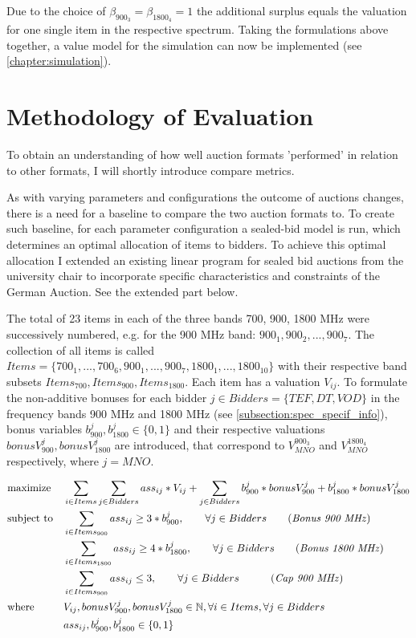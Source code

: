 Due to the choice of $ \beta_{900_{3}} = \beta_{1800_{4}} = 1 $ the additional surplus equals the valuation for one single item in the respective spectrum.
Taking the formulations above together, a value model for the simulation can now be implemented (see \autoref{chapter:simulation}). 

\section{Methodology of Evaluation}\label{subsection:meth-evaluation}
To obtain an understanding of how well auction formats 'performed' in relation to other formats, I will shortly introduce compare metrics. 

As with varying parameters and configurations the outcome of auctions changes, there is a need for a baseline to compare the two auction formats to. To create such baseline, for each parameter configuration a sealed-bid model is run, which determines an optimal allocation of items to bidders. 
To achieve this optimal allocation I extended an existing linear program for sealed bid auctions from the university chair to incorporate specific characteristics and constraints of the German Auction. See the extended part below.

The total of 23 items in each of the three bands 700, 900, 1800 MHz were successively numbered, e.g. for the 900 MHz band: $ 900_1, 900_2, ..., 900_7 $. The collection of all items is called $ Items = \{700_1, ..., 700_6, 900_1, ...,  900_7, 1800_1, ..., 1800_{10}\} $ with their respective band subsets $ Items_{700}, Items_{900}, Items_{1800} $. Each item has a valuation $ V_{ij} $. To formulate the non-additive bonuses for each bidder $ j \in Bidders = \{TEF, DT, VOD\}$ in the frequency bands 900 MHz and 1800 MHz (see \autoref{subsection:spec_specif_info}), bonus variables $ b_{900}^{j}, b_{1800}^{j} \in \{0,1\} $ and their respective valuations $ bonusV_{900}^{j} , bonusV_{1800}^{j} $ are introduced, that correspond to  $ V_{MNO}^{900_3} $ and $ V_{MNO}^{1800_4} $ respectively, where $ j = MNO $.

\begin{align*}
& {\text{maximize}}
& & \sum_{i \in Items} \sum_{j \in Bidders} ass_{ij} * V_{ij} + \sum_{j \in Bidders} b_{900}^{j} * bonusV_{900}^{j}  + b_{1800}^{j} * bonusV_{1800}^{j} \\
& \text{subject to}
& & \sum_{i \in Items_{900}}  ass_{ij}  \geq 3 *  b_{900}^{j}, \qquad \forall j \in Bidders \tag{\textit{Bonus 900 MHz}} \\
&&& \sum_{i \in Items_{1800}}  ass_{ij}  \geq 4 *  b_{1800}^{j}, \qquad \forall j \in Bidders \tag{\textit{Bonus 1800 MHz}} \\
&&& \sum_{i \in Items_{900}}  ass_{ij}  \leq 3, \qquad  \forall j \in Bidders \quad \tag{\textit{Cap 900 MHz}} \\
& \text{where}
& & V_{ij}, bonusV_{900}^{j},bonusV_{1800}^{j} \in \mathbb{N}, \forall i \in Items, \forall j \in Bidders \\
&&& ass_{ij}, b_{900}^{j}, b_{1800}^{j} \in \{0,1\}
\end{align*}\label{eq:sealed-bid-lp}

